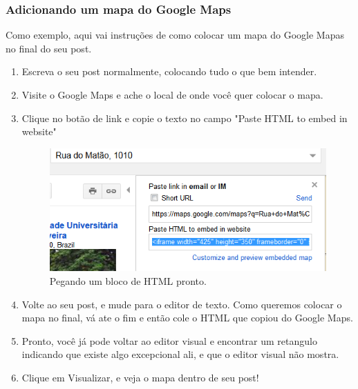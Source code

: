 \documentclass[12pt,onecolumn]{article}
\begin{document}
		\subsubsection{Adicionando um mapa do Google Maps}
			Como exemplo, aqui vai instruções de como colocar um mapa do Google Mapas
			no final do seu post.
			\begin{enumerate}
				\item Escreva o seu post normalmente, colocando tudo o que bem intender.
				\item Visite o Google Maps e ache o local de onde você quer colocar o mapa.
				\item Clique no botão de link e copie o texto no campo "Paste HTML to embed in website"
					\begin{figure}[H]
						\centering
						\includegraphics{html4.png}
						\caption{Pegando um bloco de HTML pronto.}
					\end{figure}
				\item Volte ao seu post, e mude para o editor de texto. Como queremos colocar
					o mapa no final, vá ate o fim e então cole o HTML que copiou do Google Maps.
				\item Pronto, você já pode voltar ao editor visual e encontrar um retangulo indicando que 
					existe algo excepcional ali, e que o editor visual não mostra.
				\item Clique em Visualizar, e veja o mapa dentro de seu post!
					\begin{figure}[H]
						\centering

\end{figure}
\end{enumerate}
\end{document}
